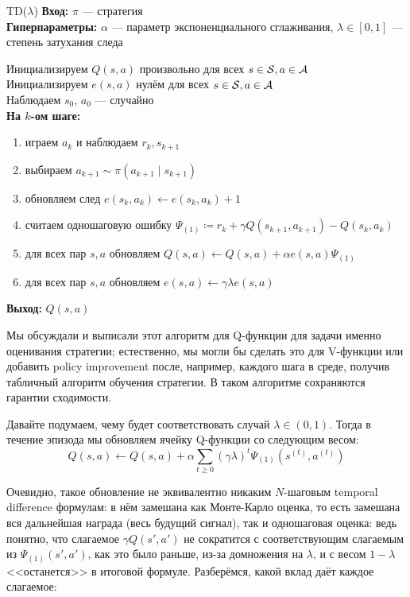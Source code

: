 \begin{algorithm}{TD($\lambda$)}
\textbf{Вход:} $\pi$ --- стратегия \\
\textbf{Гиперпараметры:} $\alpha$ --- параметр экспоненциального сглаживания, $\lambda \in [0, 1]$ --- степень затухания следа

\vspace{0.3cm}
Инициализируем $Q(s, a)$ произвольно для всех $s \in \mathcal{S}, a \in \mathcal{A}$ \\
Инициализируем $e(s, a)$ нулём для всех $s \in \mathcal{S}, a \in \mathcal{A}$ \\
Наблюдаем $s_0$, $a_0$ --- случайно \\
\textbf{На $k$-ом шаге:}
\begin{enumerate}
    \item играем $a_k$ и наблюдаем $r_k, s_{k+1}$
    \item выбираем $a_{k+1} \sim \pi(a_{k+1} \mid s_{k+1})$
    \item обновляем след $e(s_k, a_k) \leftarrow e(s_k, a_k) + 1$
    \item считаем одношаговую ошибку $\Psi_{(1)} \coloneqq r_k + \gamma Q(s_{k+1}, a_{k+1}) - Q(s_k, a_k)$
    \item для всех пар $s, a$ обновляем $Q(s, a) \leftarrow Q(s, a) + \alpha e(s, a) \Psi_{(1)}$
    \item для всех пар $s, a$ обновляем $e(s, a) \leftarrow \gamma \lambda e(s, a)$
\end{enumerate}

\vspace{0.3cm}
\textbf{Выход:} $Q(s, a)$
\end{algorithm}

Мы обсуждали и выписали этот алгоритм для Q-функции для задачи именно оценивания стратегии; естественно, мы могли бы сделать это для V-функции или добавить policy improvement после, например, каждого шага в среде, получив табличный алгоритм обучения стратегии. В таком алгоритме сохраняются гарантии сходимости.

Давайте подумаем, чему будет соответствовать случай $\lambda \in (0, 1)$. Тогда в течение эпизода мы обновляем ячейку Q-функции со следующим весом:
$$Q(s, a) \leftarrow Q(s, a) + \alpha \sum_{t \ge 0} (\gamma \lambda)^t \Psi_{(1)}(s^{(t)}, a^{(t)})$$

Очевидно, такое обновление не эквивалентно никаким $N$-шаговым temporal difference формулам: в нём замешана как Монте-Карло оценка, то есть замешана вся дальнейшая награда (весь будущий сигнал), так и одношаговая оценка: ведь понятно, что слагаемое $\gamma Q(s', a')$ не сократится с соответствующим слагаемым из $\Psi_{(1)}(s', a')$, как это было раньше, из-за домножения на $\lambda$, и с весом $1 - \lambda$ <<останется>> в итоговой формуле. Разберёмся, какой вклад даёт каждое слагаемое:

